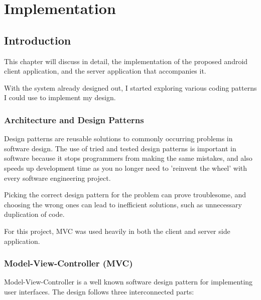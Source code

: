 
\chapter{Implementation} %

\label{Chapter5} %



\section{Introduction}

This chapter will discuss in detail, the implementation of the proposed android client application, and the server application that accompanies it.

With the system already designed out, I started exploring various coding patterns I could use to implement my design.

\subsection{Architecture and Design Patterns}

Design patterns are reusable solutions to commonly occurring problems in software design. The use of tried and tested design patterns is important in software because it stops programmers from making the same mistakes, and also speeds up development time as you no longer need to 'reinvent the wheel' with every software engineering project.

Picking the correct design pattern for the problem can prove troublesome, and choosing the wrong ones can lead to inefficient solutions, such as unnecessary duplication of code.

For this project, MVC was used heavily in both the client and server side application.

\subsection{Model-View-Controller (MVC)}

Model-View-Controller is a well known software design pattern for implementing user interfaces. The design follows three interconnected parts:

